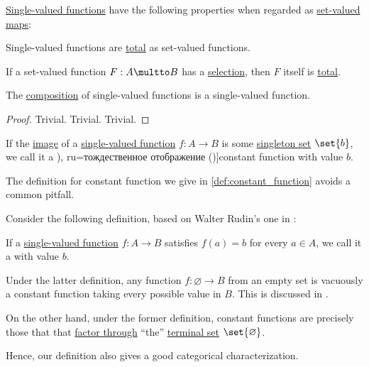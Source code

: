 \begin{proposition}\label{thm:def:function}
  \hyperref[def:function]{Single-valued functions} have the following properties when regarded as \hyperref[def:function]{set-valued maps}:
  \begin{thmenum}
     Single-valued functions are \hyperref[def:partial_function]{total} as set-valued functions.

     If a set-valued function \( F: A \multto B \) has a \hyperref[def:set_valued_selection]{selection}, then \( F \) itself is \hyperref[def:partial_function]{total}.

     The \hyperref[def:set_valued_function/composition]{composition} of single-valued functions is a single-valued function.
  \end{thmenum}
\end{proposition}
\begin{proof}
   Trivial.
   Trivial.
   Trivial.
\end{proof}

\begin{definition}\label{def:constant_function}
  If the \hyperref[def:set_valued_function/image]{image} of a \hyperref[def:function]{single-valued function} \( f: A \to B \) is some \hyperref[def:singleton_set]{singleton set} \( \set{ b } \), we call it a \term[bg=тъждествено преобразование (\cite[151]{Станилов1974АналитичнаГеометрия}), ru=тождественное отображение (\cite[46]{БелоусовТкачёв2004ДискретнаяМатематика})]{constant function} with value \( b \).
\end{definition}

\begin{remark}\label{rem:constant_function}
  The definition for constant function we give in \cref{def:constant_function} avoids a common pitfall.

  Consider the following definition, based on Walter Rudin's one in \cite[def. 4.3]{Rudin1976AnalysisPrinciples}:
  \begin{displayquote}
    If a \hyperref[def:function]{single-valued function} \( f: A \to B \) satisfies \( f(a) = b \) for every \( a \in A \), we call it a  with value \( b \).
  \end{displayquote}

  Under the latter definition, any function \( f: \varnothing \to B \) from an empty set is vacuously a constant function taking every possible value in \( B \). This is discussed in \cite{Social:empty_constant_function}.

  On the other hand, under the former definition, constant functions are precisely those that that \hyperref[def:factors_through]{factor through} \enquote{the} \hyperref[thm:universal_sets]{terminal set} \( \set{ \varnothing } \).

  Hence, our definition also gives a good categorical characterization.
\end{remark}

